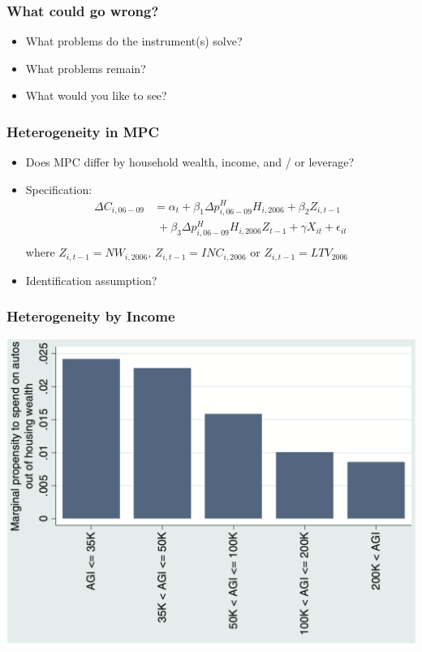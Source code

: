 \documentclass[english,xcolor=svgnames]{beamer}
\begin{document}
\begin{frame}
\frametitle[alignment=center]{What could go wrong?}
\begin{itemize}
	\item What problems do the instrument(s) solve?
	\item What problems remain?
	\item What would you like to see?
\end{itemize}
\end{frame}


\begin{frame}
\frametitle[alignment=center]{Heterogeneity in MPC}
\begin{itemize}
	\item Does MPC differ by household wealth, income, and / or leverage?
	\item Specification:
	\begin{align*}
		\Delta C_{i,06-09} &= \alpha_t + \beta_1 \Delta  p^H_{i,06-09}H_{i,2006} + \beta_2 Z_{i,t-1} \\
		& \;+ \beta_3  \Delta  p^H_{i,06-09}H_{i,2006} Z_{t-1}  + \gamma X_{it} + \epsilon_{it} \\
	\end{align*}
	where $Z_{i,t-1} = NW_{i,2006}$, $Z_{i,t-1} = INC_{i,2006}$ or $Z_{i,t-1} = LTV_{2006}$
	\item Identification assumption?
\end{itemize}
\end{frame}


\begin{frame}
\frametitle[alignment=center]{Heterogeneity by Income}
\centering
\includegraphics[scale=0.4]{figures/MRSFIG5.png}
\end{frame}
\end{document}
